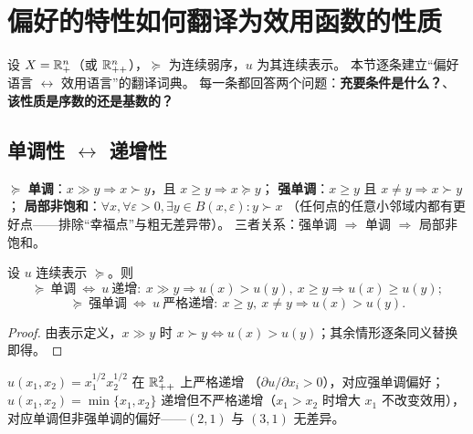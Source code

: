 \section{偏好的特性如何翻译为效用函数的性质}\label{sec:properties}

设 $X=\mathbb{R}^n_+$（或 $\mathbb{R}^n_{++}$），$\succeq$ 为连续弱序，$u$ 为其连续表示。
本节逐条建立“偏好语言 $\leftrightarrow$ 效用语言”的翻译词典。
每一条都回答两个问题：\textbf{充要条件是什么？}、\textbf{该性质是序数的还是基数的？}

\subsection{单调性 $\leftrightarrow$ 递增性}

\begin{definition}[偏好的单调性]\label{def:monotone}
$\succeq$ \textbf{单调}：$x\gg y\Rightarrow x\succ y$，且 $x\ge y\Rightarrow x\succeq y$；
\textbf{强单调}：$x\ge y$ 且 $x\ne y\Rightarrow x\succ y$；
\textbf{局部非饱和}：$\forall x,\forall\varepsilon>0,\exists y\in B(x,\varepsilon):y\succ x$
（任何点的任意小邻域内都有更好点——排除“幸福点”与粗无差异带）。
三者关系：强单调 $\Rightarrow$ 单调 $\Rightarrow$ 局部非饱和。
\end{definition}

\begin{proposition}\label{prop:mono-u}
设 $u$ 连续表示 $\succeq$。则
\[
\succeq\ \text{单调}\ \Longleftrightarrow\ u\ \text{递增}:\ x\gg y\Rightarrow u(x)>u(y),\ x\ge y\Rightarrow u(x)\ge u(y);
\]
\[
\succeq\ \text{强单调}\ \Longleftrightarrow\ u\ \text{严格递增}:\ x\ge y,\ x\ne y\Rightarrow u(x)>u(y).
\]
\end{proposition}

\begin{proof}
由表示定义，$x\gg y$ 时 $x\succ y\iff u(x)>u(y)$；其余情形逐条同义替换即得。
\end{proof}

\begin{example}
$u(x_1,x_2)=x_1^{1/2}x_2^{1/2}$ 在 $\mathbb{R}^2_{++}$ 上严格递增
（$\partial u/\partial x_i>0$），对应强单调偏好；
$u(x_1,x_2)=\min\{x_1,x_2\}$ 递增但不严格递增（$x_1>x_2$ 时增大 $x_1$ 不改变效用），
对应单调但非强单调的偏好——$(2,1)$ 与 $(3,1)$ 无差异。
\end{example}

